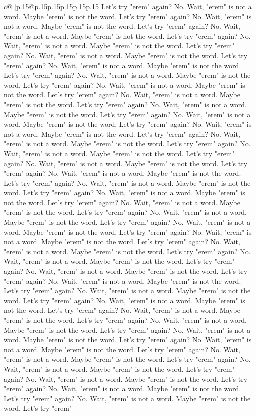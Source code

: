 \documentclass{article}
\begin{document}
{\begin{supertabular}{c@{$\;$}|p{.15\linewidth}@{}p{.15\linewidth}p{.15\linewidth}p{.15\linewidth}p{.15\linewidth}p{.15\linewidth}}
{{{Let's try "erem" again? No. Wait, "erem" is not a word. Maybe "erem" is not the word. Let's try "erem" again? No. Wait, "erem" is not a word. Maybe "erem" is not the word. Let's try "erem" again? No. Wait, "erem" is not a word. Maybe "erem" is not the word. Let's try "erem" again? No. Wait, "erem" is not a word. Maybe "erem" is not the word. Let's try "erem" again? No. Wait, "erem" is not a word. Maybe "erem" is not the word. Let's try "erem" again? No. Wait, "erem" is not a word. Maybe "erem" is not the word. Let's try "erem" again? No. Wait, "erem" is not a word. Maybe "erem" is not the word. Let's try "erem" again? No. Wait, "erem" is not a word. Maybe "erem" is not the word. Let's try "erem" again? No. Wait, "erem" is not a word. Maybe "erem" is not the word. Let's try "erem" again? No. Wait, "erem" is not a word. Maybe "erem" is not the word. Let's try "erem" again? No. Wait, "erem" is not a word. Maybe "erem" is not the word. Let's try "erem" again? No. Wait, "erem" is not a word. Maybe "erem" is not the word. Let's try "erem" again? No. Wait, "erem" is not a word. Maybe "erem" is not the word. Let's try "erem" again? No. Wait, "erem" is not a word. Maybe "erem" is not the word. Let's try "erem" again? No. Wait, "erem" is not a word. Maybe "erem" is not the word. Let's try "erem" again? No. Wait, "erem" is not a word. Maybe "erem" is not the word. Let's try "erem" again? No. Wait, "erem" is not a word. Maybe "erem" is not the word. Let's try "erem" again? No. Wait, "erem" is not a word. Maybe "erem" is not the word. Let's try "erem" again? No. Wait, "erem" is not a word. Maybe "erem" is not the word. Let's try "erem" again? No. Wait, "erem" is not a word. Maybe "erem" is not the word. Let's try "erem" again? No. Wait, "erem" is not a word. Maybe "erem" is not the word. Let's try "erem" again? No. Wait, "erem" is not a word. Maybe "erem" is not the word. Let's try "erem" again? No. Wait, "erem" is not a word. Maybe "erem" is not the word. Let's try "erem" again? No. Wait, "erem" is not a word. Maybe "erem" is not the word. Let's try "erem" again? No. Wait, "erem" is not a word. Maybe "erem" is not the word. Let's try "erem" again? No. Wait, "erem" is not a word. Maybe "erem" is not the word. Let's try "erem" again? No. Wait, "erem" is not a word. Maybe "erem" is not the word. Let's try "erem" again? No. Wait, "erem" is not a word. Maybe "erem" is not the word. Let's try "erem" again? No. Wait, "erem" is not a word. Maybe "erem" is not the word. Let's try "erem" again? No. Wait, "erem" is not a word. Maybe "erem" is not the word. Let's try "erem" again? No. Wait, "erem" is not a word. Maybe "erem" is not the word. Let's try "erem" again? No. Wait, "erem" is not a word. Maybe "erem" is not the word. Let's try "erem" again? No. Wait, "erem" is not a word. Maybe "erem" is not the word. Let's try "erem" again? No. Wait, "erem" is not a word. Maybe "erem" is not the word. Let's try "erem" again? No. Wait, "erem" is not a word. Maybe "erem" is not the word. Let's try "erem" again? No. Wait, "erem" is not a word. Maybe "erem" is not the word. Let's try "erem" again? No. Wait, "erem" is not a word. Maybe "erem" is not the word. Let's try "erem" }}}
\end{supertabular}}
\end{document}
